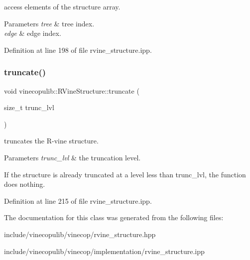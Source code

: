 access elements of the structure array. 


\begin{DoxyParams}{Parameters}
{\em tree} & tree index. \\
\hline
{\em edge} & edge index. \\
\hline
\end{DoxyParams}


Definition at line 198 of file rvine\+\_\+structure.\+ipp.

\mbox{\label{classvinecopulib_1_1_r_vine_structure_a7580c0663ac702f718944de2a0fcd1d3}} 
\subsubsection{\texorpdfstring{truncate()}{truncate()}}
{\footnotesize\ttfamily void vinecopulib\+::\+R\+Vine\+Structure\+::truncate (\begin{DoxyParamCaption}\item[{size\+\_\+t}]{trunc\+\_\+lvl }\end{DoxyParamCaption})\hspace{0.3cm}{\ttfamily [inline]}}



truncates the R-\/vine structure. 


\begin{DoxyParams}{Parameters}
{\em trunc\+\_\+lvl} & the truncation level.\\
\hline
\end{DoxyParams}
If the structure is already truncated at a level less than {\ttfamily trunc\+\_\+lvl}, the function does nothing. 

Definition at line 215 of file rvine\+\_\+structure.\+ipp.



The documentation for this class was generated from the following files\+:\begin{DoxyCompactItemize}
\item 
include/vinecopulib/vinecop/rvine\+\_\+structure.\+hpp\item 
include/vinecopulib/vinecop/implementation/rvine\+\_\+structure.\+ipp\end{DoxyCompactItemize}
